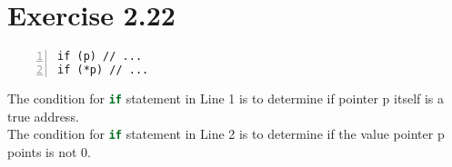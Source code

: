 \documentclass{article}
\begin{document}
\section*{Exercise 2.22}

\begin{lstlisting}[basicstyle=\ttfamily, numbers=left, xleftmargin=2em]
if (p) // ...
if (*p) // ...
\end{lstlisting}

\begin{flushleft}
The condition for \lstinline[language=C++]|if| statement in Line 1 is to determine if pointer p itself is a true address.\\
The condition for \lstinline[language=C++]|if| statement in Line 2 is to determine if the value pointer p points is not 0.
\end{flushleft}
\end{document}
